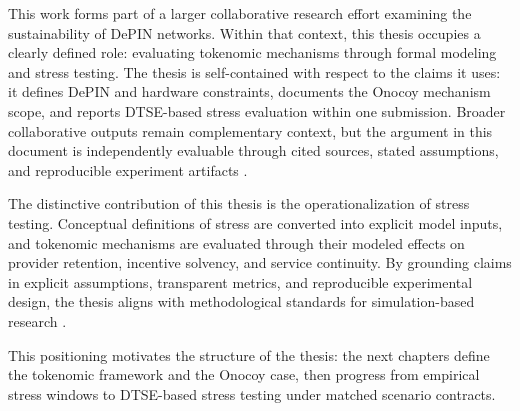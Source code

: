 This work forms part of a larger collaborative research effort examining the sustainability of DePIN networks. Within that context, this thesis occupies a clearly defined role: evaluating tokenomic mechanisms through formal modeling and stress testing. The thesis is self-contained with respect to the claims it uses: it defines DePIN and hardware constraints, documents the Onocoy mechanism scope, and reports DTSE-based stress evaluation within one submission. Broader collaborative outputs remain complementary context, but the argument in this document is independently evaluable through cited sources, stated assumptions, and reproducible experiment artifacts \cite{Braakman2022}.

The distinctive contribution of this thesis is the operationalization of stress testing. Conceptual definitions of stress are converted into explicit model inputs, and tokenomic mechanisms are evaluated through their modeled effects on provider retention, incentive solvency, and service continuity. By grounding claims in explicit assumptions, transparent metrics, and reproducible experimental design, the thesis aligns with methodological standards for simulation-based research \cite{Morris2019, Collins2024}.

This positioning motivates the structure of the thesis: the next chapters define the tokenomic framework and the Onocoy case, then progress from empirical stress windows to DTSE-based stress testing under matched scenario contracts.

\ifincludeprovenance

\fi
